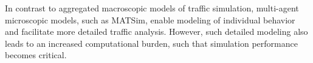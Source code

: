 In contrast to aggregated macroscopic models of traffic simulation, multi-agent microscopic models, such as MATSim, enable modeling of individual behavior and facilitate more detailed traffic analysis. However, such detailed modeling also leads to an increased computational burden, such that simulation performance becomes critical.